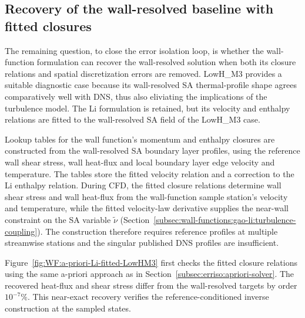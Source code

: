 \subsection{Recovery of the wall-resolved baseline with fitted closures}
\label{subsec:comparative:zpg:fitted-closure}
 
The remaining question, to close the error isolation loop, is whether the wall-function formulation can recover the wall-resolved solution when both its closure relations and spatial discretization errors are removed. LowH\_M3 provides a suitable diagnostic case because its wall-resolved SA thermal-profile shape agrees comparatively well with DNS, thus also eliviating the implications of the turbulence model. The Li formulation is retained, but its velocity and enthalpy relations are fitted to the wall-resolved SA field of the LowH\_M3 case.
\par\medskip

Lookup tables for the wall function's momentum and enthalpy closures are constructed from the wall-resolved SA boundary layer profiles, using the reference wall shear stress, wall heat-flux and local boundary layer edge velocity and temperature. The tables store the fitted velocity relation and a correction to the Li enthalpy relation. During CFD, the fitted closure relations determine wall shear stress and wall heat-flux from the wall-function sample station's velocity and temperature, while the fitted velocity-law derivative supplies the near-wall constraint on the SA variable $\tilde{\nu}$ (Section~\ref{subsec:wall-functions:gao-li:turbulence-coupling}). The construction therefore requires reference profiles at multiple streamwise stations and the singular published DNS profiles are insufficient.
\par\medskip

Figure~\ref{fig:WF:a-priori-Li-fitted-LowHM3} first checks the fitted closure relations using the same a-priori approach as in Section~\ref{subsec:erriso:apriori-solver}. The recovered heat-flux and shear stress differ from the wall-resolved targets by order $10^{-7}\%$. This near-exact recovery verifies the reference-conditioned inverse construction at the sampled states.

